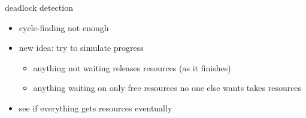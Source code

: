\begin{frame}{deadlock detection}
    \begin{itemize}
        \item cycle-finding not enough
            \vspace{.5cm}
        \item new idea: try to simulate progress
            \begin{itemize}
            \item anything not waiting releases resources (as it finishes)
            \item anything waiting on only free resources no one else wants takes resources
            \end{itemize}
        \item see if everything gets resources eventually
    \end{itemize}
\end{frame}

